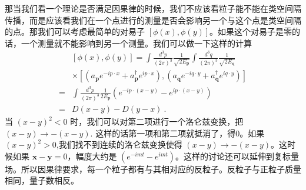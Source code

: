 那当我们看一个理论是否满足因果律的时候，我们不应该看粒子能不能在类空间隔传播，而是应该看我们在一个点进行的测量是否会影响另一个与这个点是类空间隔的点。那我们可以考虑最简单的对易子 $[\phi(x),\phi(y)]$。如果这个对易子是零的话，一个测量就不能影响到另一个测量。我们可以做一下这样的计算
\begin{equation}
\begin{aligned}
&[\phi(x), \phi(y)]=\int \frac{d^{3} p}{(2 \pi)^{3}} \frac{1}{\sqrt{2 E_{\mathbf{p}}}} \int \frac{d^{3} q}{(2 \pi)^{3}} \frac{1}{\sqrt{2 E_{\mathbf{q}}}} \\
&\times\left[\left(a_{\mathbf{p}} e^{-i p \cdot x}+a_{\mathbf{p}}^{\dagger} e^{i p \cdot x}\right),\left(a_{\mathbf{q}} e^{-i q \cdot y}+a_{\mathbf{q}}^{\dagger} e^{i q \cdot y}\right)\right] \\
=& \int \frac{d^{3} p}{(2 \pi)^{3}} \frac{1}{2 E_{\mathbf{p}}}\left(e^{-i p \cdot(x-y)}-e^{i p \cdot(x-y)}\right) \\
=& D(x-y)-D(y-x)~.
\end{aligned}
\end{equation}
当 $(x-y)^2<0$ 时，我们可以对第二项进行一个洛仑兹变换，把 $(x-y)\rightarrow -(x-y)$. 这样的话第一项和第二项就抵消了，得0。如果 $(x-y)^2>0$,我们找不到连续的洛仑兹变换使得 $(x-y)\rightarrow - (x-y)$。这时候如果 $\mathbf x - \mathbf y = 0$，幅度大约是 $(e^{-imt}-e^{imt})$。这样的讨论还可以延伸到复标量场。所以因果律要求，每一个粒子都有与其相对应的反粒子。反粒子与正粒子质量相同，量子数相反。



